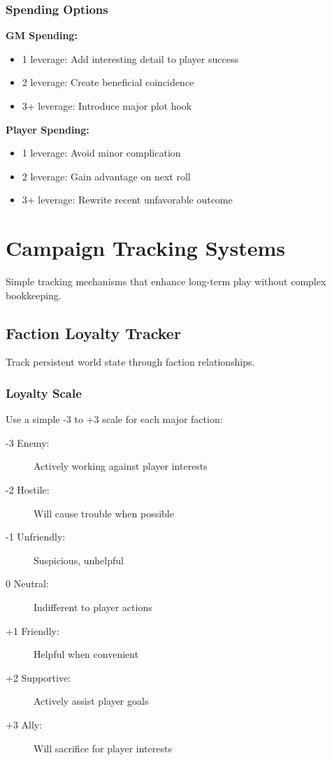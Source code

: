 \subsubsection{Spending Options}

\textbf{GM Spending:}
\begin{itemize}
\item 1 leverage: Add interesting detail to player success
\item 2 leverage: Create beneficial coincidence
\item 3+ leverage: Introduce major plot hook
\end{itemize}

\textbf{Player Spending:}
\begin{itemize}
\item 1 leverage: Avoid minor complication
\item 2 leverage: Gain advantage on next roll
\item 3+ leverage: Rewrite recent unfavorable outcome
\end{itemize}

\section{Campaign Tracking Systems}

Simple tracking mechanisms that enhance long-term play without complex bookkeeping.

\subsection{Faction Loyalty Tracker}

Track persistent world state through faction relationships.

\subsubsection{Loyalty Scale}

Use a simple -3 to +3 scale for each major faction:
\begin{description}
\item[-3 Enemy:] Actively working against player interests
\item[-2 Hostile:] Will cause trouble when possible
\item[-1 Unfriendly:] Suspicious, unhelpful
\item[0 Neutral:] Indifferent to player actions
\item[+1 Friendly:] Helpful when convenient
\item[+2 Supportive:] Actively assist player goals
\item[+3 Ally:] Will sacrifice for player interests
\end{description}

